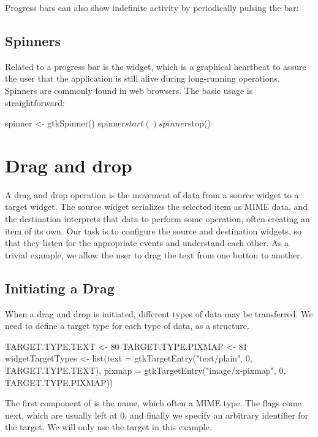 Progress bars can also show indefinite activity by periodically
pulsing the bar: 
\begin{Schunk}
\end{Schunk}

\subsection{Spinners}

Related to a progress bar is the  widget, which is a
graphical heartbeat to assure the user that the application is still
alive during long-running operations. Spinners are commonly found in
web browsers. The basic usage is straightforward:
\begin{Schunk}
\begin{Sinput}
 spinner <- gtkSpinner()
 spinner$start()
 spinner$stop()
\end{Sinput}
\end{Schunk}

\section{Drag and drop}
\label{sec:RGtk2:dnd}


A drag and drop operation is the movement of data from a source widget
to a target widget. The source widget serializes the selected item as
MIME data, and the destination interprets that data to perform some
operation, often creating an item of its own. Our task is to configure
the source and destination widgets, so that they listen for the
appropriate events and understand each other. As a trivial example, we
allow the user to drag the text from one button to another.

\subsection{Initiating a Drag}

When a drag and drop is initiated, different types of data may be
transferred. We need to define a target type for each type of data, as
a  structure. 
\begin{Schunk}
\begin{Sinput}
 TARGET.TYPE.TEXT   <- 80                 
 TARGET.TYPE.PIXMAP <- 81                  
 widgetTargetTypes <- 
   list(text = gtkTargetEntry("text/plain", 0, 
          TARGET.TYPE.TEXT),
        pixmap = gtkTargetEntry("image/x-pixmap", 0, 
          TARGET.TYPE.PIXMAP))
\end{Sinput}
\end{Schunk}
%
The first component of  is the name, which often
a MIME type. The flags come next, which are usually left at $0$, and
finally we specify an arbitrary identifier for the target. We will
only use the  target in this example.

